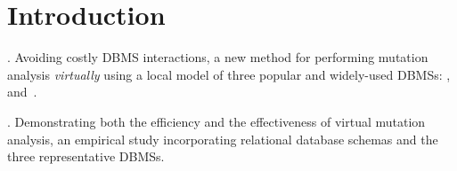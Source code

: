 
\section{Introduction}
\label{sec:introduction}


\vspace{1mm} . Avoiding costly DBMS interactions, a new method for performing mutation analysis {\it virtually} using a
local model of three popular and widely-used DBMSs: \HyperSQL, \mbox{\Postgres and \SQLite.}

\vspace{1mm} . Demonstrating both the efficiency and the effectiveness of \mbox{virtual} mutation analysis, an empirical study
incorporating \numschemas relational database schemas and the three representative DBMSs.


